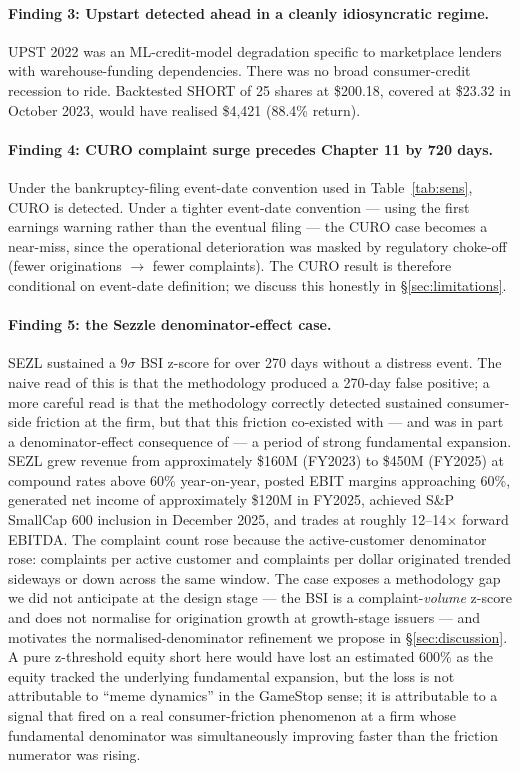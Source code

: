 \documentclass[11pt,a4paper]{article}
\begin{document}
\paragraph{Finding 3: Upstart detected ahead in a cleanly idiosyncratic regime.} UPST 2022 was an ML-credit-model degradation specific to marketplace lenders with warehouse-funding dependencies. There was no broad consumer-credit recession to ride. Backtested SHORT of 25 shares at \$200.18, covered at \$23.32 in October 2023, would have realised \$4{,}421 (88.4\% return).

\paragraph{Finding 4: CURO complaint surge precedes Chapter 11 by 720 days.} Under the bankruptcy-filing event-date convention used in Table~\ref{tab:sens}, CURO is detected. Under a tighter event-date convention --- using the first earnings warning rather than the eventual filing --- the CURO case becomes a near-miss, since the operational deterioration was masked by regulatory choke-off (fewer originations $\to$ fewer complaints). The CURO result is therefore conditional on event-date definition; we discuss this honestly in §\ref{sec:limitations}.

\paragraph{Finding 5: the Sezzle denominator-effect case.} SEZL sustained a 9$\sigma$ BSI z-score for over 270 days without a distress event. The naive read of this is that the methodology produced a 270-day false positive; a more careful read is that the methodology correctly detected sustained consumer-side friction at the firm, but that this friction co-existed with --- and was in part a denominator-effect consequence of --- a period of strong fundamental expansion. SEZL grew revenue from approximately \$160M (FY2023) to \$450M (FY2025) at compound rates above 60\% year-on-year, posted EBIT margins approaching 60\%, generated net income of approximately \$120M in FY2025, achieved S\&P SmallCap 600 inclusion in December 2025, and trades at roughly 12--14$\times$ forward EBITDA. The complaint count rose because the active-customer denominator rose: complaints per active customer and complaints per dollar originated trended sideways or down across the same window. The case exposes a methodology gap we did not anticipate at the design stage --- the BSI is a complaint-\emph{volume} z-score and does not normalise for origination growth at growth-stage issuers --- and motivates the normalised-denominator refinement we propose in §\ref{sec:discussion}. A pure z-threshold equity short here would have lost an estimated 600\% as the equity tracked the underlying fundamental expansion, but the loss is not attributable to ``meme dynamics'' in the GameStop sense; it is attributable to a signal that fired on a real consumer-friction phenomenon at a firm whose fundamental denominator was simultaneously improving faster than the friction numerator was rising.
\end{document}
